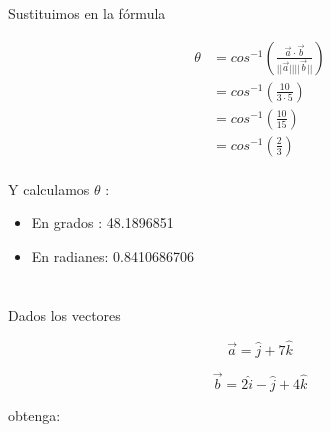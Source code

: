 \documentclass[12pt]{article}
\begin{document}
Sustituimos en la fórmula

\begin{equation*}
  \begin{split}
    \theta &= cos^{-1 }\left(\frac{\vec{a} \cdot \vec{b}}{||\vec{a}|| ||\vec{b}||}\right) \\
    &=  cos^{-1 }\left(\frac{10}{3 \cdot 5} \right) \\
    &= cos^{-1 }\left(\frac{10}{15} \right) \\
    &= cos^{-1 }\left(\frac{2}{3} \right) \\
  \end{split}
\end{equation*}

Y  calculamos $\theta$ :

\begin{itemize}
  
\item En grados : 48.1896851
  
\item En radianes: 0.8410686706
  
\end{itemize}

\section{}

Dados los vectores

\[\vec{a} = \hat{j}+ 7\hat{k}\]

\[\vec{b} = 2\hat{i} - \hat{j}+ 4\hat{k}\]

obtenga:
\end{document}
